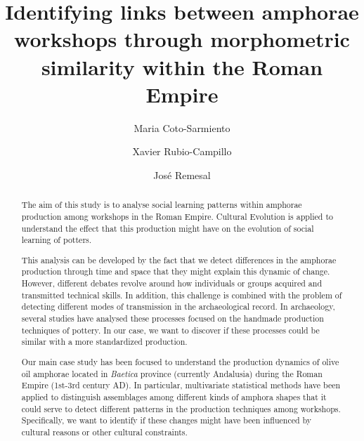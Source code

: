 \documentclass[review]{elsarticle}
\begin{document}
\begin{frontmatter}

\title{Identifying links between amphorae workshops through morphometric similarity within the Roman Empire }


\author[bscadress]{Maria Coto-Sarmiento}


\author[edadress]{Xavier Rubio-Campillo}
\author[ceipacadress]{Jos\'e Remesal}




\address[bscadress]{Barcelona Supercomputing Center (BSC), Barcelona, Spain}
\address[edadress]{University of Edinburgh, UK}
\address[ceipacadress]{CEIPAC, University of Barcelona, Barcelona, Spain}
\begin{abstract}

The aim of this study is to analyse social learning patterns within amphorae production among workshops in the Roman Empire. Cultural Evolution is applied to understand the effect that this production might have on the evolution of social learning of potters. 

This analysis can be developed by the fact that we detect differences in the amphorae production through time and space that they might explain this dynamic of change. However,  different debates revolve around how individuals or groups acquired and transmitted technical skills. In addition, this challenge is combined with the problem of detecting different modes of transmission in the archaeological record. In archaeology, several studies have analysed these processes focused on the handmade production techniques of pottery. In our case, we want to discover if these processes could be similar with a more standardized production. 

Our main case study has been focused to understand the production dynamics of olive oil amphorae located in \textit{Baetica} province (currently Andalusia) during the Roman Empire (1st-3rd century AD). In particular, multivariate statistical methods have been applied to distinguish  assemblages among different kinds of amphora shapes that it could serve to detect different patterns in the production techniques among workshops. Specifically, we want to identify if these changes might have been influenced by cultural reasons or other cultural constraints.


\end{abstract}
\end{frontmatter}
\end{document}

